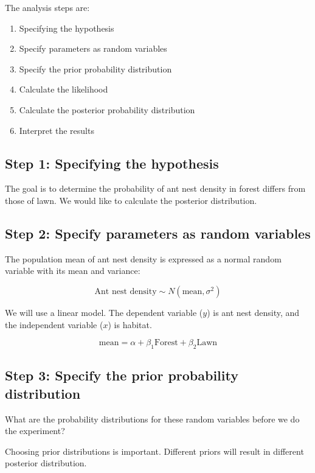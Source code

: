 \documentclass[
]{book}
\providecommand{\tightlist}{%
  \setlength{\itemsep}{0pt}\setlength{\parskip}{0pt}}
\begin{document}
The analysis steps \citep{gotelli2014} are:

\begin{enumerate}
\def\labelenumi{\arabic{enumi}.}
\tightlist
\item
  Specifying the hypothesis
\item
  Specify parameters as random variables
\item
  Specify the prior probability distribution
\item
  Calculate the likelihood
\item
  Calculate the posterior probability distribution
\item
  Interpret the results
\end{enumerate}

\subsection{Step 1: Specifying the hypothesis}\label{step-1-specifying-the-hypothesis}

The goal is to determine the probability of ant nest density in forest differs from those of lawn. We would like to calculate the posterior distribution.

\subsection{Step 2: Specify parameters as random variables}\label{step-2-specify-parameters-as-random-variables}

The population mean of ant nest density is expressed as a normal random variable with its mean and variance:

\[\text{Ant nest density} \sim N(\text{mean}, \sigma^2)\]

We will use a linear model. The dependent variable (\(y\)) is ant nest density, and the independent variable (\(x\)) is habitat.

\[\text{mean} = \alpha + \beta_1 \text{Forest} + \beta_2 \text{Lawn}\]

\subsection{Step 3: Specify the prior probability distribution}\label{step-3-specify-the-prior-probability-distribution}

What are the probability distributions for these random variables before we do the experiment?

Choosing prior distributions is important. Different priors will result in different posterior distribution.
\end{document}
